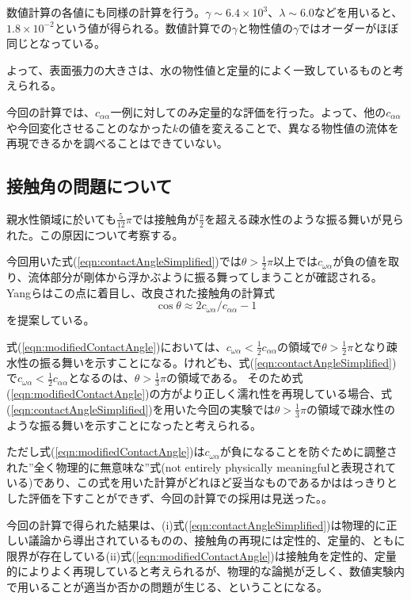 \documentclass[]{jsarticle}
\begin{document}
数値計算の各値にも同様の計算を行う。$\gamma\sim6.4\times 10^3$、$\lambda\sim 6.0$などを用いると、$1.8\times 10^{-2}$という値が得られる。数値計算での$\gamma$と物性値の$\gamma$ではオーダーがほぼ同じとなっている。

よって、表面張力の大きさは、水の物性値と定量的によく一致しているものと考えられる。

今回の計算では、$c_{\alpha\alpha}$一例に対してのみ定量的な評価を行った。よって、他の$c_{\alpha\alpha}$や今回変化させることのなかった$k$の値を変えることで、異なる物性値の流体を再現できるかを調べることはできていない。

\subsection{接触角の問題について}
\label{subsec:discContact}
親水性領域に於いても$\frac{5}{12}\pi$では接触角が$\frac{\pi}{2}$を超える疎水性のような振る舞いが見られた。この原因について考察する。

今回用いた式(\ref{eqn:contactAngleSimplified})では$\theta>\frac{1}{2}\pi$以上では$c_{\omega\alpha}$が負の値を取り、流体部分が剛体から浮かぶように振る舞ってしまうことが確認される。Yang\cite{Yang2017}らはこの点に着目し、改良された接触角の計算式
\begin{equation}
  \label{eqn:modifiedContactAngle}
\cos \theta \approx 2c_{\omega\alpha}/c_{\alpha\alpha} -1
\end{equation}
を提案している。

式(\ref{eqn:modifiedContactAngle})においては、$c_{\omega\alpha}<\frac{1}{2}c_{\alpha\alpha}$の領域で$\theta>\frac{1}{2}\pi$となり疎水性の振る舞いを示すことになる。けれども、式(\ref{eqn:contactAngleSimplified})で$c_{\omega\alpha}<\frac{1}{2}c_{\alpha\alpha}$となるのは、$\theta>\frac{1}{3}\pi$の領域である。
そのため式(\ref{eqn:modifiedContactAngle})の方がより正しく濡れ性を再現している場合、式(\ref{eqn:contactAngleSimplified})を用いた今回の実験では$\theta>\frac{1}{3}\pi$の領域で疎水性のような振る舞いを示すことになったと考えられる。

ただし式(\ref{eqn:modifiedContactAngle})は$c_{\omega\alpha}$が負になることを防ぐために調整された”全く物理的に無意味な”式(not entirely physically meaningfulと表現されている)であり、この式を用いた計算がどれほど妥当なものであるかははっきりとした評価を下すことができず、今回の計算での採用は見送った。。

今回の計算で得られた結果は、(i)式(\ref{eqn:contactAngleSimplified})は物理的に正しい議論から導出されているものの、接触角の再現には定性的、定量的、ともに限界が存在している(ii)式(\ref{eqn:modifiedContactAngle})は接触角を定性的、定量的によりよく再現していると考えられるが、物理的な論拠が乏しく、数値実験内で用いることが適当か否かの問題が生じる、ということになる。
\end{document}
